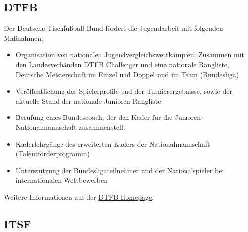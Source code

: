 \subsection{DTFB}
\label{jugend:kontakte:dtfb}

Der Deutsche Tischfußball-Bund fördert die Jugendarbeit mit folgenden Maßnahmen:
\begin{itemize}
\item Organisation von nationalen Jugendvergleichswettkämpfen: Zusammen mit den Landesverbänden DTFB Challenger und eine nationale Rangliste, Deutsche Meisterschaft im Einzel und Doppel und im Team (Bundesliga) 
\item Veröffentlichung der Spielerprofile und der Turnierergebnisse, sowie der aktuelle Stand der nationale Junioren-Rangliste 
\item Berufung eines Bundescoach, der den Kader für die Junioren-Nationalmannschaft zusammenstellt
\item Kaderlehrgänge des erweiterten Kaders der Nationalmannschaft (Talentförderprogramm)
\item Unterstützung der Bundesligateilnehmer und der Nationalspieler bei internationalen Wettbewerben 
\end{itemize}

Weitere Informationen auf der \href{http://www.dtfb.de/}{DTFB-Homepage}.


\subsection{ITSF}
\label{jugend:kontakte:itsf}


